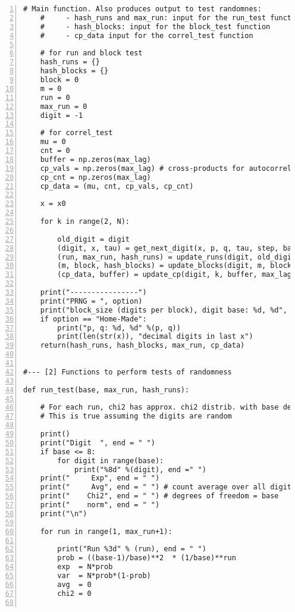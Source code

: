 \documentclass[oneside,10pt]{book}
\begin{document}
\begin{lstlisting}[numbers=left]
    # Main function. Also produces output to test randomnes:
    #     - hash_runs and max_run: input for the run_test function
    #     - hash_blocks: input for the block_test function
    #     - cp_data input for the correl_test function

    # for run and block test
    hash_runs = {}
    hash_blocks = {}
    block = 0 
    m = 0
    run = 0
    max_run = 0
    digit = -1    
 
    # for correl_test
    mu = 0 
    cnt = 0 
    buffer = np.zeros(max_lag) 
    cp_vals = np.zeros(max_lag) # cross-products for autocorrel 
    cp_cnt = np.zeros(max_lag) 
    cp_data = (mu, cnt, cp_vals, cp_cnt)

    x = x0

    for k in range(2, N): 

        old_digit = digit
        (digit, x, tau) = get_next_digit(x, p, q, tau, step, base, option) 
        (run, max_run, hash_runs) = update_runs(digit, old_digit, run, max_run, hash_runs)
        (m, block, hash_blocks) = update_blocks(digit, m, block, base, block_size, hash_blocks)
        (cp_data, buffer) = update_cp(digit, k, buffer, max_lag, N, cp_data)

    print("----------------")        
    print("PRNG = ", option) 
    print("block_size (digits per block), digit base: %d, %d", block_size, base)
    if option == "Home-Made":
        print("p, q: %d, %d" %(p, q))
        print(len(str(x)), "decimal digits in last x")
    return(hash_runs, hash_blocks, max_run, cp_data)


#--- [2] Functions to perform tests of randomness

def run_test(base, max_run, hash_runs):

    # For each run, chi2 has approx. chi2 distrib. with base degrees of freedom
    # This is true assuming the digits are random

    print()
    print("Digit  ", end = " ")
    if base <= 8:
        for digit in range(base):
            print("%8d" %(digit), end =" ")
    print("     Exp", end = " ")
    print("     Avg", end = " ") # count average over all digits 
    print("    Chi2", end = " ") # degrees of freedom = base
    print("    norm", end = " ") 
    print("\n")

    for run in range(1, max_run+1):

        print("Run %3d" % (run), end = " ")
        prob = ((base-1)/base)**2  * (1/base)**run 
        exp  = N*prob 
        var  = N*prob*(1-prob)
        avg  = 0
        chi2 = 0  


\end{lstlisting}
\end{document}
